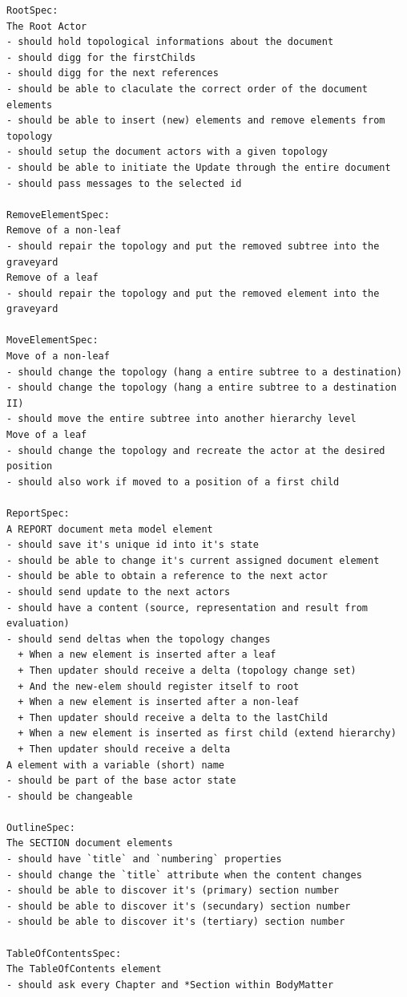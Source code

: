  
\begin{verbatim}
RootSpec:
The Root Actor
- should hold topological informations about the document
- should digg for the firstChilds
- should digg for the next references
- should be able to claculate the correct order of the document elements
- should be able to insert (new) elements and remove elements from topology
- should setup the document actors with a given topology
- should be able to initiate the Update through the entire document
- should pass messages to the selected id

RemoveElementSpec:
Remove of a non-leaf
- should repair the topology and put the removed subtree into the graveyard
Remove of a leaf
- should repair the topology and put the removed element into the graveyard

MoveElementSpec:
Move of a non-leaf
- should change the topology (hang a entire subtree to a destination)
- should change the topology (hang a entire subtree to a destination II)
- should move the entire subtree into another hierarchy level
Move of a leaf
- should change the topology and recreate the actor at the desired position
- should also work if moved to a position of a first child

ReportSpec:
A REPORT document meta model element
- should save it's unique id into it's state
- should be able to change it's current assigned document element
- should be able to obtain a reference to the next actor
- should send update to the next actors
- should have a content (source, representation and result from evaluation)
- should send deltas when the topology changes
  + When a new element is inserted after a leaf 
  + Then updater should receive a delta (topology change set) 
  + And the new-elem should register itself to root 
  + When a new element is inserted after a non-leaf 
  + Then updater should receive a delta to the lastChild 
  + When a new element is inserted as first child (extend hierarchy) 
  + Then updater should receive a delta 
A element with a variable (short) name
- should be part of the base actor state
- should be changeable

OutlineSpec:
The SECTION document elements
- should have `title` and `numbering` properties
- should change the `title` attribute when the content changes
- should be able to discover it's (primary) section number
- should be able to discover it's (secundary) section number
- should be able to discover it's (tertiary) section number

TableOfContentsSpec:
The TableOfContents element
- should ask every Chapter and *Section within BodyMatter


\end{verbatim}
